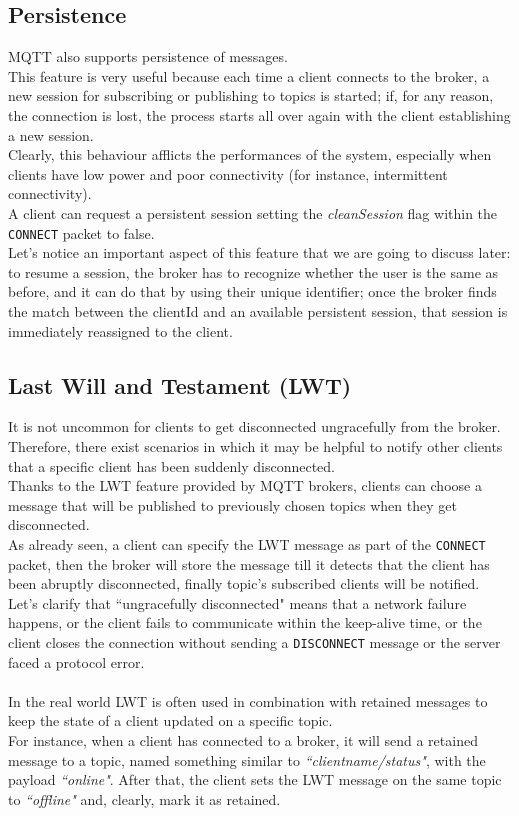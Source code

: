 \documentclass[12pt]{report}
\begin{document}
{{\subsection{Persistence}
\label{ssec:mqttpersistence}
\bigskip
MQTT also supports persistence of messages.\\
This feature is very useful because each time a client connects to the broker, a new session for subscribing or publishing to topics is started; if, for any reason, the connection is lost, the process starts all over again with the client establishing a new session.\\
Clearly, this behaviour afflicts the performances of the system, especially when clients have low power and poor connectivity (for instance, intermittent connectivity).\\
A client can request a persistent session setting the \emph{cleanSession} flag within the \texttt{CONNECT} packet to false.\\
Let's notice an important aspect of this feature that we are going to discuss later: to resume a session, the broker has to recognize whether the user is the same as before, and it can do that by using their unique identifier; once the broker finds the match between the clientId and an available persistent session, that session is immediately reassigned to the client.\\

\subsection{Last Will and Testament (LWT)}
\bigskip
It is not uncommon for clients to get disconnected ungracefully from the broker.\\
Therefore, there exist scenarios in which it may be helpful to notify other clients that a specific client has been suddenly disconnected.\\
Thanks to the LWT feature provided by MQTT brokers, clients can choose a message that will be published to previously chosen topics when they get disconnected.\\
As already seen, a client can specify the LWT message as part of the \texttt{CONNECT} packet, then the broker will store the message till it detects that the client has been abruptly disconnected, finally topic's subscribed clients will be notified.\\
Let's clarify that ``ungracefully disconnected" means that a network failure happens, or the client fails to communicate within the keep-alive time, or the client closes the connection without sending a \texttt{DISCONNECT} message or the server faced a protocol error.\\\\
In the real world LWT is often used in combination with retained messages to keep the state of a client updated on a specific topic.\\
For instance, when a client has connected to a broker, it will send a retained message to a topic, named something similar to \emph{``clientname/status"}, with the payload \emph{``online"}.
After that, the client sets the LWT message on the same topic to \emph{``offline"} and, clearly, mark it as retained.\\

}}
\end{document}
